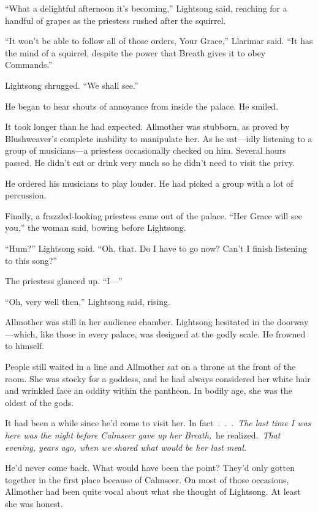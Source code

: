 “What a delightful afternoon it’s becoming,” Lightsong said, reaching for a handful of grapes as the priestess rushed after the squirrel.

“It won’t be able to follow all of those orders, Your Grace,” Llarimar said. “It has the mind of a squirrel, despite the power that Breath gives it to obey Commands.”

Lightsong shrugged. “We shall see.”

He began to hear shouts of annoyance from inside the palace. He smiled.

It took longer than he had expected. Allmother was stubborn, as proved by Blushweaver’s complete inability to manipulate her. As he sat—idly listening to a group of musicians—a priestess occasionally checked on him. Several hours passed. He didn’t eat or drink very much so he didn’t need to visit the privy.

He ordered his musicians to play louder. He had picked a group with a lot of percussion.

Finally, a frazzled-looking priestess came out of the palace. “Her Grace will see you,” the woman said, bowing before Lightsong.

“Hum?” Lightsong said. “Oh, that. Do I have to go now? Can’t I finish listening to this song?”

The priestess glanced up. “I—”

“Oh, very well then,” Lightsong said, rising.

\orn

Allmother was still in her audience chamber. Lightsong hesitated in the doorway—which, like those in every palace, was designed at the godly scale. He frowned to himself.

People still waited in a line and Allmother sat on a throne at the front of the room. She was stocky for a goddess, and he had always considered her white hair and wrinkled face an oddity within the pantheon. In bodily age, she was the oldest of the gods.

It had been a while since he’d come to visit her. In fact~.~.~.~\textit{The last time I was here was the night before Calmseer gave up her Breath,}~he realized.~\textit{That evening, years ago, when we shared what would be her last meal.}

He’d never come back. What would have been the point? They’d only gotten together in the first place because of Calmseer. On most of those occasions, Allmother had been quite vocal about what she thought of Lightsong. At least she was honest.

